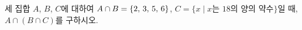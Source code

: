 세 집합 $A$, $B$, $C$에 대하여 $A\cap B=\{2,\mkern3mu 3,\mkern3mu 5,\mkern3mu 6\}$, $C=\{x \mid x$는 $18$의 양의 약수$\}$일 때, $A\cap(B\cap C)$를 구하시오.
